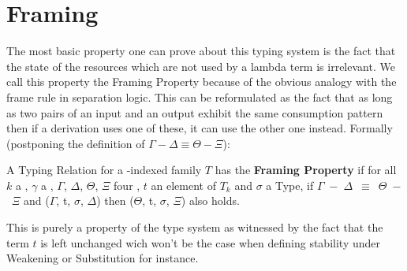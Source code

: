 
\section{Framing}\label{sec:framing}

The most basic property one can prove about this typing system is
the fact that the state of the resources which are not used by a
lambda term is irrelevant. We call this property the Framing
Property because of the obvious analogy with the frame rule in
separation logic. This can be reformulated as the fact that as
long as two pairs of an input and an output \Usages{} exhibit the
same consumption pattern then if a derivation uses one of these,
it can use the other one instead. Formally (postponing the
definition of $\ensuremath{\Gamma} \ensuremath{-} \ensuremath{\Delta} \ensuremath{\equiv} \ensuremath{\Theta} \ensuremath{-} \ensuremath{\Xi}$):

\begin{definition}A Typing Relation \TR{\cdot{}} for a \Nat{}-indexed
family $T$ has the \textbf{Framing Property} if for all $k$ a \Nat{},
\ensuremath{\gamma} a , \ensuremath{\Gamma}, \ensuremath{\Delta}, \ensuremath{\Theta}, \ensuremath{\Xi} four \Usages{\ensuremath{\gamma}}, $t$ an element
of $T_k$ and \ensuremath{\sigma} a Type, if \mbox{\ensuremath{\Gamma} \ensuremath{-} \ensuremath{\Delta} \ensuremath{\equiv} \ensuremath{\Theta} \ensuremath{-} \ensuremath{\Xi}} and (\ensuremath{\Gamma}, t, \ensuremath{\sigma}, \ensuremath{\Delta})
then (\ensuremath{\Theta}, t, \ensuremath{\sigma}, \ensuremath{\Xi}) also holds.
\end{definition}

\begin{remark}This is purely a property of the type system as
witnessed by the fact that the term $t$ is left unchanged wich
won't be the case when defining stability under Weakening or
Substitution for instance.
\end{remark}


